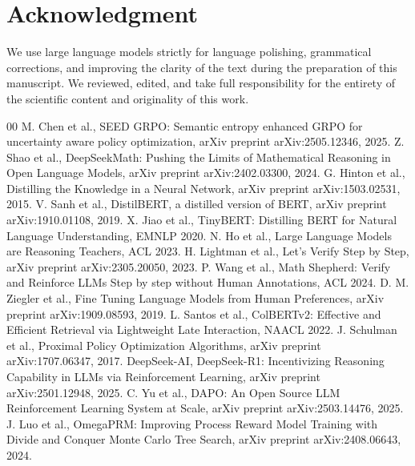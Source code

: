 \documentclass[conference]{IEEEtran}
\begin{document}
\section*{Acknowledgment}
We use large language models strictly for language polishing, grammatical corrections, and improving the clarity of the text during the preparation of this manuscript. We reviewed, edited, and take full responsibility for the entirety of the scientific content and originality of this work.

\begin{thebibliography}{00}
 M. Chen et al., SEED GRPO: Semantic entropy enhanced GRPO for uncertainty aware policy optimization, arXiv preprint arXiv:2505.12346, 2025.
 Z. Shao et al., DeepSeekMath: Pushing the Limits of Mathematical Reasoning in Open Language Models, arXiv preprint arXiv:2402.03300, 2024.
 G. Hinton et al., Distilling the Knowledge in a Neural Network, arXiv preprint arXiv:1503.02531, 2015.
 V. Sanh et al., DistilBERT, a distilled version of BERT, arXiv preprint arXiv:1910.01108, 2019.
 X. Jiao et al., TinyBERT: Distilling BERT for Natural Language Understanding, EMNLP 2020.
 N. Ho et al., Large Language Models are Reasoning Teachers, ACL 2023.
 H. Lightman et al., Let's Verify Step by Step, arXiv preprint arXiv:2305.20050, 2023.
 P. Wang et al., Math Shepherd: Verify and Reinforce LLMs Step by step without Human Annotations, ACL 2024.
 D. M. Ziegler et al., Fine Tuning Language Models from Human Preferences, arXiv preprint arXiv:1909.08593, 2019.
 L. Santos et al., ColBERTv2: Effective and Efficient Retrieval via Lightweight Late Interaction, NAACL 2022.
 J. Schulman et al., Proximal Policy Optimization Algorithms, arXiv preprint arXiv:1707.06347, 2017.
 DeepSeek-AI, DeepSeek-R1: Incentivizing Reasoning Capability in LLMs via Reinforcement Learning, arXiv preprint arXiv:2501.12948, 2025.
 C. Yu et al., DAPO: An Open Source LLM Reinforcement Learning System at Scale, arXiv preprint arXiv:2503.14476, 2025.
 J. Luo et al., OmegaPRM: Improving Process Reward Model Training with Divide and Conquer Monte Carlo Tree Search, arXiv preprint arXiv:2408.06643, 2024.
\end{thebibliography}
\end{document}
